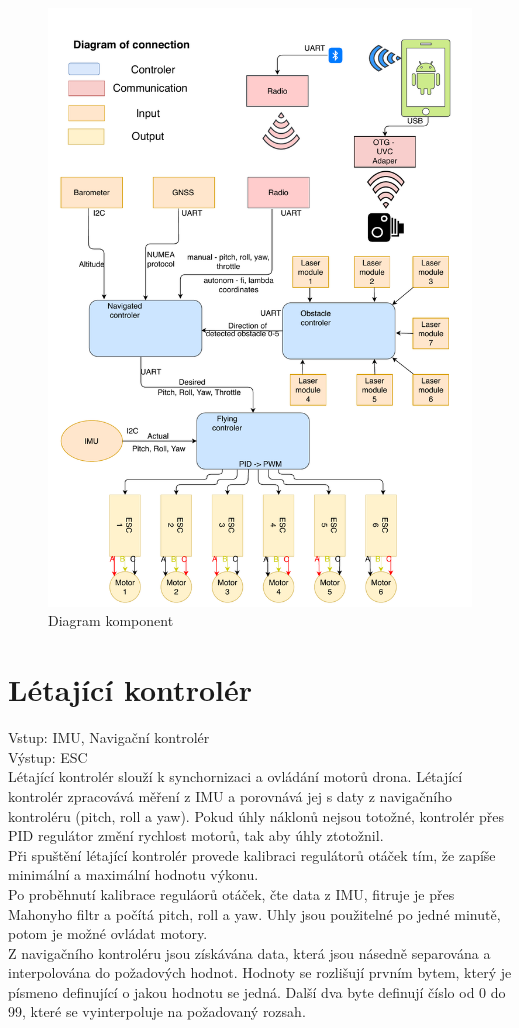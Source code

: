 \begin{figure}[h]
	\centering
	\includegraphics[width=15cm]{pictures/DroneDiagram.pdf}
	\caption{Diagram komponent}
\end{figure}

\section{Létající kontrolér} 
Vstup: IMU, Navigační kontrolér\\
Výstup: ESC\\

Létající kontrolér slouží k synchornizaci a ovládání motorů drona. Létající kontrolér zpracovává měření z IMU a porovnává jej s daty z navigačního kontroléru (pitch, roll a yaw). Pokud úhly náklonů nejsou totožné, kontrolér přes PID regulátor změní rychlost motorů, tak aby úhly ztotožnil.\\
Při spuštění létající kontrolér provede kalibraci regulátorů otáček tím, že zapíše minimální a maximální hodnotu výkonu.\\
Po proběhnutí kalibrace reguláorů otáček, čte data z IMU, fitruje je přes Mahonyho filtr a počítá pitch, roll a yaw. Uhly jsou použitelné po jedné minutě, potom je možné ovládat motory.\\
Z navigačního kontroléru jsou získávána data, která jsou násedně separována a interpolována do požadových hodnot. Hodnoty se rozlišují prvním bytem, který je písmeno definující o jakou hodnotu se jedná. Další dva byte definují číslo od 0 do 99, které se vyinterpoluje na požadovaný rozsah.\\

